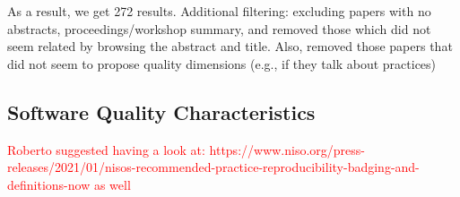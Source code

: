 As a result, we get 272 results. Additional filtering: excluding papers with no abstracts, proceedings/workshop summary, and removed those which did not seem related by browsing the abstract and title. Also, removed those papers that did not seem to propose quality dimensions (e.g., if they talk about practices)




\subsection{Software Quality Characteristics}

\textcolor{red}{Roberto suggested having a look at: https://www.niso.org/press-releases/2021/01/nisos-recommended-practice-reproducibility-badging-and-definitions-now as well}

